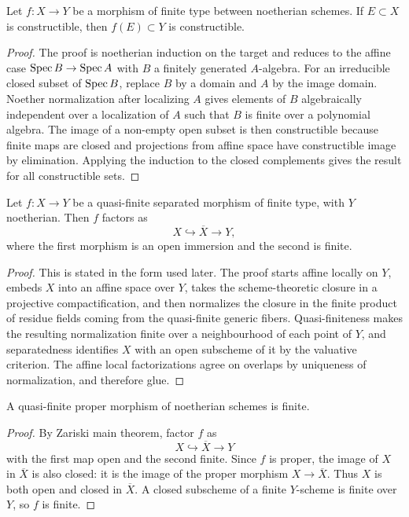 \begin{theorem}
Let \(f:X\to Y\) be a morphism of finite type between noetherian schemes.  If
\(E\subset X\) is constructible, then \(f(E)\subset Y\) is constructible.
\end{theorem}

\begin{proof}
The proof is noetherian induction on the target and reduces to the affine case
\(\operatorname{Spec} B\to\operatorname{Spec} A\) with \(B\) a finitely generated \(A\)-algebra.  For an
irreducible closed subset of \(\operatorname{Spec} B\), replace \(B\) by a domain and \(A\) by
the image domain.  Noether normalization after localizing \(A\) gives elements
of \(B\) algebraically independent over a localization of \(A\) such that \(B\)
is finite over a polynomial algebra.  The image of a non-empty open subset is
then constructible because finite maps are closed and projections from affine
space have constructible image by elimination.  Applying the induction to the
closed complements gives the result for all constructible sets.
\end{proof}

\begin{theorem}
Let \(f:X\to Y\) be a quasi-finite separated morphism of finite type, with
\(Y\) noetherian.  Then \(f\) factors as
\[
    X\hookrightarrow \overline X\longrightarrow Y,
\]
where the first morphism is an open immersion and the second is finite.
\end{theorem}

\begin{proof}
This is stated in the form used later.  The proof starts affine locally on
\(Y\), embeds \(X\) into an affine space over \(Y\), takes the scheme-theoretic
closure in a projective compactification, and then normalizes the closure in
the finite product of residue fields coming from the quasi-finite generic
fibers.  Quasi-finiteness makes the resulting normalization finite over a
neighbourhood of each point of \(Y\), and separatedness identifies \(X\) with
an open subscheme of it by the valuative criterion.  The affine local
factorizations agree on overlaps by uniqueness of normalization, and therefore
glue.
\end{proof}

\begin{corollary}
A quasi-finite proper morphism of noetherian schemes is finite.
\end{corollary}

\begin{proof}
By Zariski main theorem, factor \(f\) as
\[
    X\hookrightarrow \overline X\to Y
\]
with the first map open and the second finite.  Since \(f\) is proper, the
image of \(X\) in \(\overline X\) is also closed: it is the image of the proper
morphism \(X\to\overline X\).  Thus \(X\) is both open and closed in
\(\overline X\).  A closed subscheme of a finite \(Y\)-scheme is finite over
\(Y\), so \(f\) is finite.
\end{proof}

